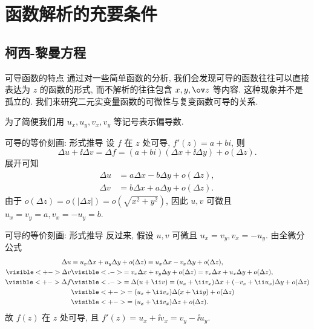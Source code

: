 \section{函数解析的充要条件}

\subsection{柯西-黎曼方程}
\begin{frame}{可导函数的特点}
	\onslide<+->
	通过对一些简单函数的分析, 我们会发现可导的函数往往可以直接表达为 $z$ 的函数的形式, 而不解析的往往包含 $x,y,\ov z$ 等内容.
	\onslide<+->
	这种现象并不是孤立的.
	\onslide<+->
	我们来研究二元实变量函数的可微性与复变函数可导的关系.

	\onslide<+->
	为了简便我们用 $u_x,u_y,v_x,v_y$ 等记号表示偏导数.
\end{frame}


\begin{frame}{可导的等价刻画: 形式推导}
	\onslide<+->
	设 \alert{$f$ 在 $z$ 处可导}, $f'(z)=a+bi$,
	\onslide<+->
	则
	\[\Delta u+\ii\Delta v=\Delta f=(a+bi)(\Delta x+\ii\Delta y)+o(\Delta z).
	\]
	\onslide<+->展开可知
	\begin{align*}
		\Delta u&=a\Delta x-b\Delta y+o(\Delta z),\\
		\Delta v&=b\Delta x+a\Delta y+o(\Delta z).
	\end{align*}
	\onslide<+->
	由于 $o(\Delta z)=o(|\Delta z|)=o(\sqrt{x^2+y^2})$,
	\onslide<+->
	因此 \alert{$u,v$ 可微且 $u_x=v_y=a,v_x=-u_y=b$}.
\end{frame}


\begin{frame}{可导的等价刻画: 形式推导}
	\onslide<+->
	反过来, 假设 \alert{$u,v$ 可微且 $u_x=v_y, v_x=-u_y$}.
	\onslide<+->
	由全微分公式
	\begin{align*}
		\Delta u&=u_x\Delta x+u_y\Delta y+o(\Delta z)
			=u_x\Delta x-v_x\Delta y+o(\Delta z),\\
			\visible<+->{\Delta v}&\visible<.->{=v_x\Delta x+v_y\Delta y+o(\Delta z)
			=v_x\Delta x+u_x\Delta y+o(\Delta z),}\\
		\visible<+->{\Delta f}&
		\visible<.->{=\Delta (u+\ii v)=(u_x+\ii v_x)\Delta x+(-v_x+\ii u_x)\Delta y}+o(\Delta z)\\
		&\visible<+->{=(u_x+\ii v_x)\Delta(x+\ii y)+o(\Delta z)}\\
		&\visible<+->{=(u_x+\ii v_x)\Delta z+o(\Delta z).}
	\end{align*}
	\onslide<+->
	故 \alert{$f(z)$ 在 $z$ 处可导, 且 $f'(z)=u_x+\ii v_x=v_y-\ii u_y$}.
\end{frame}


